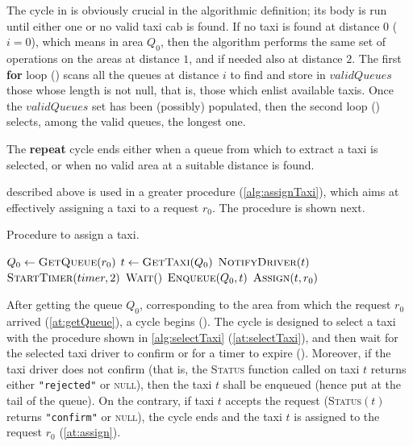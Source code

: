 The cycle in  is obviously crucial in the algorithmic definition; its body is run until either one or no valid taxi cab is found. If no taxi is found at distance $0$ ($i=0$), which means in area $Q_0$, then the algorithm performs the same set of operations on the areas at distance $1$, and if needed also at distance $2$. The first \textbf{for} loop () scans all the queues at distance $i$ to find and store in $validQueues$ those whose length is not null, that is, those which enlist available taxis. Once the $validQueues$ set has been (possibly) populated, then the second loop () selects, among the valid queues, the longest one.

The \textbf{repeat} cycle ends either when a queue from which to extract a taxi is selected, or when no valid area at a suitable distance is found.

 described above is used in a greater procedure (\cref{alg:assignTaxi}), which aims at effectively assigning a taxi to a request $r_0$. The procedure is shown next.




\begin{algorithm}
\caption{Procedure to assign a taxi.} \label{alg:assignTaxi}
\begin{algorithmic}[1]
	\State $Q_0 \gets \Call{GetQueue}{r_0}$ \label{at:getQueue}
	\Repeat \label{at:repeat}
		\State $t \gets \Call{\GetTaxi}{Q_0}$ \label{at:selectTaxi}
		\State $\Call{NotifyDriver}{t}$ \label{at:notifyDriver}
		\State $\Call{StartTimer}{timer,2}$ \label{at:startTimer}
			\State $\Call{Wait}{\nullfont}$
		\EndWhile \label{at:endWhile}
			\State $\Call{Enqueue}{Q_0,t}$
		\EndIf
	 \label{at:until}
	\State $\Call{Assign}{t,r_0}$ \label{at:assign}
\EndProcedure
\end{algorithmic}
\end{algorithm}


After getting the queue $Q_0$, corresponding to the area from which the request $r_0$ arrived (\cref{at:getQueue}), a cycle begins (). The cycle is designed to select a taxi with the procedure shown in \cref{alg:selectTaxi} (\cref{at:selectTaxi}), and then wait for the selected taxi driver to confirm or for a timer to expire (). Moreover, if the taxi driver does not confirm (that is, the \textsc{Status} function called on taxi $t$ returns either \texttt{"rejected"} or \textsc{null}), then the taxi $t$ shall be enqueued (hence put at the tail of the queue). On the contrary, if taxi $t$ accepts the request (\textsc{Status}$\left(t\right)$ returns \texttt{"confirm"} or \textsc{null}), the cycle ends and the taxi $t$ is assigned to the request $r_0$ (\cref{at:assign}).




